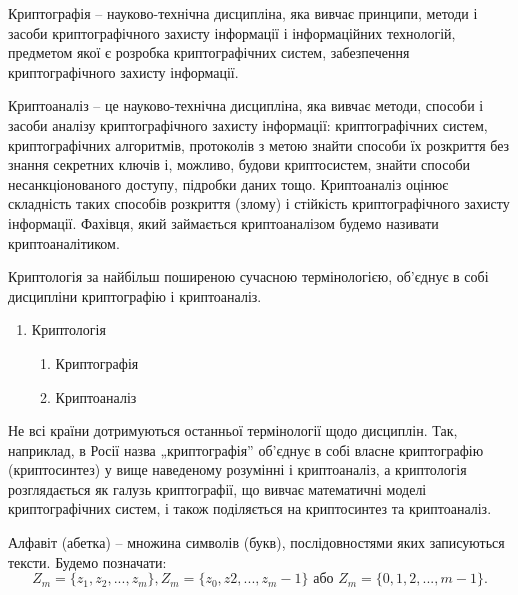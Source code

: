 \begin{definition}[Криптографія]
    Криптографія – науково-технічна дисципліна, яка вивчає принципи,
    методи і засоби криптографічного захисту інформації і інформаційних
    технологій, предметом якої є розробка криптографічних систем,
    забезпечення криптографічного захисту інформації.
\end{definition}

\begin{definition}[Криптоаналіз]
    Криптоаналіз – це науково-технічна дисципліна, яка вивчає методи,
    способи і засоби аналізу криптографічного захисту інформації:
    криптографічних систем, криптографічних алгоритмів, протоколів з метою
    знайти способи їх розкриття без знання секретних ключів і, можливо, будови
    криптосистем, знайти способи несанкціонованого доступу, підробки даних
    тощо. Криптоаналіз оцінює складність таких способів розкриття (злому) і
    стійкість криптографічного захисту інформації. Фахівця, який займається
    криптоаналізом будемо називати криптоаналітиком.
\end{definition}


Криптологія за найбільш поширеною сучасною термінологією,
об'єднує в собі дисципліни криптографію і криптоаналіз.

\begin{enumerate}
    \item Криптологія
    \begin{enumerate}
        \item Криптографія
        \item Криптоаналіз
    \end{enumerate}
\end{enumerate}

\begin{remark}
    Не всі країни дотримуються останньої термінології щодо
    дисциплін. Так, наприклад, в Росії назва „криптографія” об’єднує в собі
    власне криптографію (криптосинтез) у вище наведеному розумінні і
    криптоаналіз, а криптологія розглядається як галузь криптографії, що вивчає
    математичні моделі криптографічних систем, і також поділяється на
    криптосинтез та криптоаналіз.
\end{remark}

\begin{definition}
    Алфавіт (абетка) – множина символів (букв), послідовностями яких
    записуються тексти. Будемо позначати:
    $$Z_m = \{z_1, z_2, ..., z_m\}, Z_m = \{z_0, z2, ..., z_m-1\} \text{ або } Z_m = \{0, 1, 2, ..., m-1 \}.$$
\end{definition}

